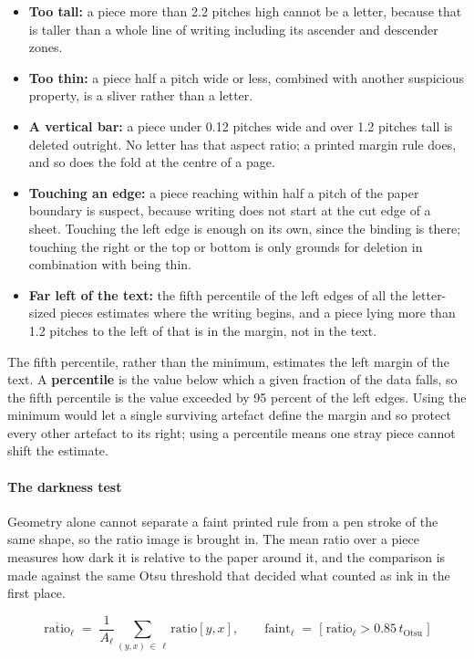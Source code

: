 \begin{itemize}\setlength\itemsep{0pt}
  \item \textbf{Too tall:} a piece more than 2.2 pitches high cannot be a letter, because that is taller than a whole line of writing including its ascender and descender zones.
  \item \textbf{Too thin:} a piece half a pitch wide or less, combined with another suspicious property, is a sliver rather than a letter.
  \item \textbf{A vertical bar:} a piece under 0.12 pitches wide and over 1.2 pitches tall is deleted outright. No letter has that aspect ratio; a printed margin rule does, and so does the fold at the centre of a page.
  \item \textbf{Touching an edge:} a piece reaching within half a pitch of the paper boundary is suspect, because writing does not start at the cut edge of a sheet. Touching the left edge is enough on its own, since the binding is there; touching the right or the top or bottom is only grounds for deletion in combination with being thin.
  \item \textbf{Far left of the text:} the fifth percentile of the left edges of all the letter-sized pieces estimates where the writing begins, and a piece lying more than 1.2 pitches to the left of that is in the margin, not in the text.
\end{itemize}
The fifth percentile, rather than the minimum, estimates the left margin of the text. A \textbf{percentile} is the value below which a given fraction of the data falls, so the fifth percentile is the value exceeded by 95 percent of the left edges. Using the minimum would let a single surviving artefact define the margin and so protect every other artefact to its right; using a percentile means one stray piece cannot shift the estimate.


\paragraph{The darkness test}
Geometry alone cannot separate a faint printed rule from a pen stroke of the same shape, so the ratio image is brought in. The mean ratio over a piece measures how dark it is relative to the paper around it, and the comparison is made against the same Otsu threshold that decided what counted as ink in the first place.


\begin{equation}
\overline{\mathrm{ratio}}_{\ell} \;=\; \frac{1}{A_{\ell}}\sum_{(y,x)\,\in\,\ell} \mathrm{ratio}[y,x], \qquad \mathrm{faint}_{\ell} \;=\; \big[\;\overline{\mathrm{ratio}}_{\ell} > 0.85\,t_{\mathrm{Otsu}}\;\big]
\end{equation}

